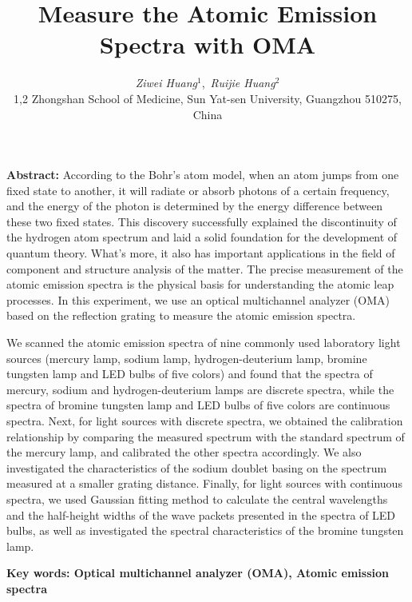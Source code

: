 \documentclass[12pt,a4paper,UTF8]{ctexart}
\begin{document}
\title{\Large\bfseries Measure the Atomic Emission Spectra with OMA\footnotemark[1]}
\author{\large\textit{Ziwei Huang}$^{1}$\footnotemark[2],\ \large\textit{Ruijie Huang}$^{2}$\footnotemark[3] \\ 
\small{1,2 Zhongshan School of Medicine, Sun Yat-sen University, Guangzhou  { \rm 510275}, China}}
\date{}
\maketitle\thispagestyle{empty} 

\vspace{-1.5em}
\begin{spacing}{1.5}
{\bfseries Abstract:}
According to the Bohr's atom model, when an atom jumps from one fixed state to another, it will radiate or absorb photons of a certain frequency, and the energy of the photon is determined by the energy difference between these two fixed states. 
This discovery successfully explained the discontinuity of the hydrogen atom spectrum and laid a solid foundation for the development of quantum theory. 
What's more, it also has important applications in the field of component and structure analysis of the matter. 
The precise measurement of the atomic emission spectra is the physical basis for understanding the atomic leap processes. 
In this experiment, we use an optical multichannel analyzer (OMA)  based on the reflection grating to measure the atomic emission spectra.

We scanned the atomic emission spectra of nine commonly used laboratory light sources (mercury lamp, sodium lamp, hydrogen-deuterium lamp, bromine tungsten lamp and LED bulbs of five colors) and found that the spectra of mercury, sodium and hydrogen-deuterium lamps are discrete spectra, while the spectra of bromine tungsten lamp and LED bulbs of five colors are continuous spectra. 
Next, for light sources with discrete spectra, we obtained the calibration relationship by comparing the measured spectrum with the standard spectrum of the mercury lamp, and calibrated the other spectra accordingly. 
We also investigated the characteristics of the sodium doublet basing on the spectrum measured at a smaller grating distance. 
Finally, for light sources with continuous spectra, we used Gaussian fitting method to calculate the central wavelengths and the half-height widths of the wave packets presented in the spectra of LED bulbs, as well as investigated the spectral characteristics of the bromine tungsten lamp.
\par
\bfseries{Key words}: Optical multichannel analyzer (OMA), Atomic emission spectra
\vspace{2em}
\end{spacing}

\renewcommand{\thefootnote}{\fnsymbol{footnote}}
\end{document}
